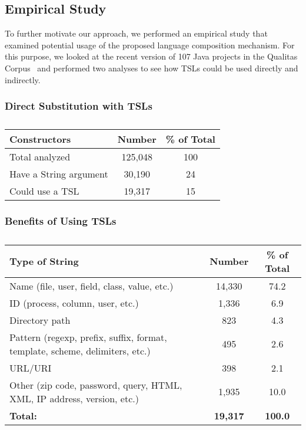 \subsection{Empirical Study}

To further motivate our approach, we performed an empirical study that examined potential usage of the proposed language composition mechanism. For this purpose, we looked at the recent version of 107 Java projects in the Qualitas Corpus~\cite{QualitasCorpus:APSEC:2010} and performed two analyses to see how TSLs could be used directly and indirectly.

\subsubsection{Direct Substitution with TSLs}

\begin{table}[t] %
   \centering
    \begin{tabular}{l | c | c}
    \bf Constructors & \bf Number & \bf \% of Total \\ \hline
    Total analyzed & 125,048 & 100 \\
    Have a String argument & 30,190 & 24 \\
    Could use a TSL & 19,317 & 15 \\
    \end{tabular}
    \caption{}
\end{table}

\subsubsection{Benefits of Using TSLs}

\begin{table}
   \centering
    \begin{tabular}{l | c | c}
    \bf Type of String & \bf Number & \bf \% of Total \\ \hline
    Name (file, user, field, class, value, etc.) & 14,330 & 74.2 \\
    ID (process, column, user, etc.)	& 1,336 & 6.9 \\
    Directory path& 823 & 4.3 \\
    Pattern (regexp, prefix, suffix, format, template, scheme, delimiters, etc.) & 495 & 2.6 \\
    URL/URI & 398 & 2.1 \\
    Other (zip code, password, query, HTML, XML, IP address, version, etc.) & 1,935 & 10.0 \\ \hline
    \bf Total: & \bf 19,317 & \bf 100.0
    \end{tabular}
    \caption{}
\end{table}

